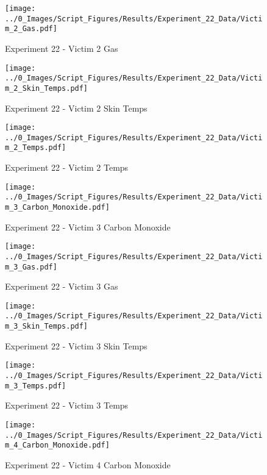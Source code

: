 	\clearpage

	\begin{figure}[H]
		\centering
		\texttt{[image: ../0\_Images/Script\_Figures/Results/Experiment\_22\_Data/Victim\_2\_Gas.pdf]}
		\caption[]{Experiment 22 - Victim 2 Gas}
	\end{figure}
 

	\begin{figure}[H]
		\centering
		\texttt{[image: ../0\_Images/Script\_Figures/Results/Experiment\_22\_Data/Victim\_2\_Skin\_Temps.pdf]}
		\caption[]{Experiment 22 - Victim 2 Skin Temps}
	\end{figure}
 
	\clearpage

	\begin{figure}[H]
		\centering
		\texttt{[image: ../0\_Images/Script\_Figures/Results/Experiment\_22\_Data/Victim\_2\_Temps.pdf]}
		\caption[]{Experiment 22 - Victim 2 Temps}
	\end{figure}
 

	\begin{figure}[H]
		\centering
		\texttt{[image: ../0\_Images/Script\_Figures/Results/Experiment\_22\_Data/Victim\_3\_Carbon\_Monoxide.pdf]}
		\caption[]{Experiment 22 - Victim 3 Carbon Monoxide}
	\end{figure}
 
	\clearpage

	\begin{figure}[H]
		\centering
		\texttt{[image: ../0\_Images/Script\_Figures/Results/Experiment\_22\_Data/Victim\_3\_Gas.pdf]}
		\caption[]{Experiment 22 - Victim 3 Gas}
	\end{figure}
 

	\begin{figure}[H]
		\centering
		\texttt{[image: ../0\_Images/Script\_Figures/Results/Experiment\_22\_Data/Victim\_3\_Skin\_Temps.pdf]}
		\caption[]{Experiment 22 - Victim 3 Skin Temps}
	\end{figure}
 
	\clearpage

	\begin{figure}[H]
		\centering
		\texttt{[image: ../0\_Images/Script\_Figures/Results/Experiment\_22\_Data/Victim\_3\_Temps.pdf]}
		\caption[]{Experiment 22 - Victim 3 Temps}
	\end{figure}
 

	\begin{figure}[H]
		\centering
		\texttt{[image: ../0\_Images/Script\_Figures/Results/Experiment\_22\_Data/Victim\_4\_Carbon\_Monoxide.pdf]}
		\caption[]{Experiment 22 - Victim 4 Carbon Monoxide}
	\end{figure}
 
